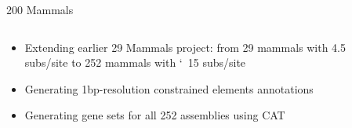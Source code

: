 \documentclass[10pt]{beamer}
\begin{document}
\begin{frame}{200 Mammals}
  \begin{columns}
    \begin{column}{0.5\textwidth}
      \begin{itemize}
          \item Extending earlier 29 Mammals project: from 29 mammals with 4.5 subs/site to 252 mammals with \char`~15 subs/site
          \item Generating 1bp-resolution constrained elements annotations
          \item Generating gene sets for all 252 assemblies using CAT
      \end{itemize}
    \end{column}
    \begin{column}{0.5\textwidth}
    \end{column}
  \end{columns}
\end{frame}
\end{document}
